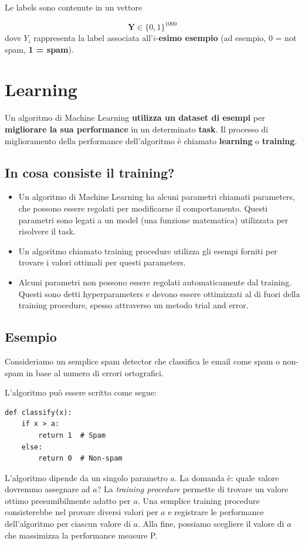 \noindent
Le labels sono contenute in un vettore

$$ \mathbf{Y} \in \{0,1\}^{1000} $$
dove $ Y_i $ rappresenta la label associata all’$i$-\textbf{esimo esempio} (ad esempio, 0 = not spam, \textbf{1 = spam}).

\section{Learning}

Un algoritmo di Machine Learning \textbf{utilizza un dataset di esempi} per \textbf{migliorare la sua performance} in un determinato \textbf{task}. Il processo di miglioramento della performance dell'algoritmo è chiamato \textbf{learning} o \textbf{training}.

\subsection{In cosa consiste il training?}

\begin{itemize}
\item Un algoritmo di Machine Learning ha alcuni parametri chiamati parameters, che possono essere regolati per modificarne il comportamento. Questi parametri sono legati a un model (una funzione matematica) utilizzata per risolvere il task.
\item Un algoritmo chiamato training procedure utilizza gli esempi forniti per trovare i valori ottimali per questi parameters.
\item Alcuni parametri non possono essere regolati automaticamente dal training. Questi sono detti hyperparameters e devono essere ottimizzati al di fuori della training procedure, spesso attraverso un metodo trial and error.
\end{itemize}

\subsection{Esempio}

Consideriamo un semplice spam detector che classifica le email come spam o non-spam in base al numero di errori ortografici. 

\noindent
L'algoritmo può essere scritto come segue:


\begin{lstlisting}[style=py,caption={Soglia sul numero di errori ortografici, chiaramente un approccio naive},label={lst:spam-threshold}]
def classify(x):
    if x > a:
        return 1  # Spam
    else:
        return 0  # Non-spam
\end{lstlisting}

\noindent
L'algoritmo dipende da un singolo parametro $a$. La domanda è: quale valore dovremmo assegnare ad $a$? La \emph{training procedure} permette di trovare un valore ottimo presumibilmente adatto per $a$.
\noindent
Una semplice training procedure consisterebbe nel provare diversi valori per $a$ e registrare le performance dell'algoritmo per ciascun valore di $a$. Alla fine, possiamo scegliere il valore di $a$ che massimizza la performance measure P.
